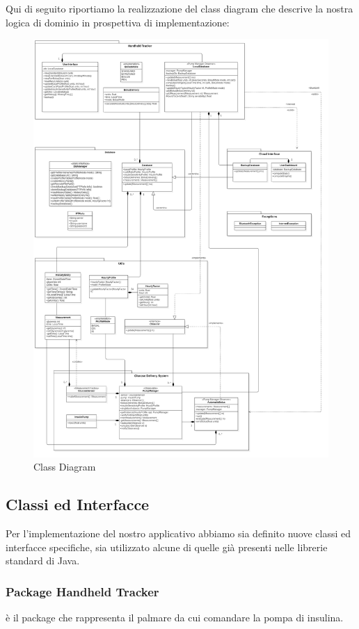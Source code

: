 \documentclass[twocolumn]{article}
\begin{document}
Qui di seguito riportiamo la realizzazione del class diagram che descrive la nostra logica di dominio in prospettiva di implementazione:
\clearpage
\begin{figure}[H]
    \centering
    \includegraphics[width=16cm]{ClassDiagram.jpg}
    \caption{Class Diagram}
    \label{fig:class-diagram}
\end{figure}
\clearpage
\subsection{Classi ed Interfacce}

Per l’implementazione del nostro applicativo abbiamo sia definito nuove classi ed interfacce specifiche, sia utilizzato alcune di quelle già presenti nelle librerie standard di Java.

\subsubsection{Package Handheld Tracker}
è il package che rappresenta il palmare da cui comandare la pompa di insulina.
\end{document}
